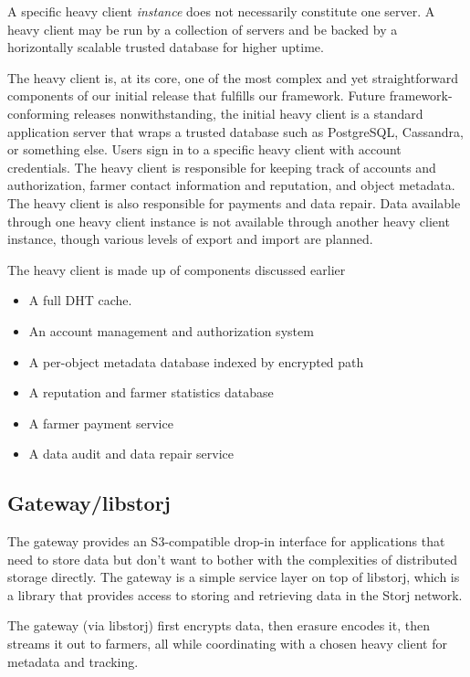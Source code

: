 \documentclass[a4paper,10pt]{article} \usepackage[utf8]{inputenc}
\begin{document}
A specific heavy client {\em instance} does not necessarily constitute one
server. A heavy client may be run by a collection of servers and be backed by
a horizontally scalable trusted database for higher uptime.

The heavy client is, at its core, one of the most complex and yet
straightforward components of our initial release that fulfills our framework.
Future framework-conforming releases nonwithstanding, the initial heavy client
is a standard application server that wraps a trusted database such as
PostgreSQL, Cassandra, or something else. Users sign in to a specific heavy
client with account credentials. The heavy client is responsible for
keeping track of accounts and authorization, farmer contact information and
reputation, and object metadata. The heavy client is also responsible for
payments and data repair. Data available through one heavy client instance is
not available through another heavy client instance, though various levels of
export and import are planned.

The heavy client is made up of components discussed earlier

\begin{itemize}
\item A full DHT cache.
\item An account management and authorization system
\item A per-object metadata database indexed by encrypted path
\item A reputation and farmer statistics database
\item A farmer payment service
\item A data audit and data repair service
\end{itemize}

\subsection{Gateway/libstorj}

The gateway provides an S3-compatible drop-in interface for applications that
need to store data but don't want to bother with the complexities of distributed
storage directly. The gateway is a simple service layer on top of libstorj,
which is a library that provides access to storing and retrieving data in the
Storj network.

The gateway (via libstorj) first encrypts data, then erasure encodes it, then
streams it out to farmers, all while coordinating with a chosen heavy client
for metadata and tracking.
\end{document}
